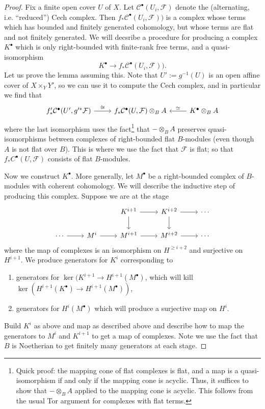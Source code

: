 \documentclass[10pt]{article}
\theoremstyle{definition}
\begin{document}
\begin{proof}
Fix a finite open cover $U$ of $X$.  Let $\mathcal{C}^\bullet(U_i, \mathcal{F})$ denote the (alternating, i.e. ``reduced'') Cech complex.  Then $f_* \mathcal{C}^\bullet(U_i, \mathcal{F}))$ is a complex whose terms which has bounded and finitely generated cohomology, but whose terms are flat and not finitely generated.  We will decsribe a procedure for producing a complex $K^\bullet$ which is only right-bounded with finite-rank free terms, and a quasi-isomorphism
$$K^\bullet \rightarrow f_* \mathcal{C}^\bullet(U_i, \mathcal{F})).$$
Let us prove the lemma assuming this.  Note that $U' := g^{-1}(U)$ is an open affine cover of $X \times_Y Y'$, so we can use it to compute the Cech complex, and in particular we find that
$$\begin{tikzcd}
f'_* \mathcal{C}^\bullet(U', g'^*\mathcal{F}) \arrow[r, "\cong"] & f_* \mathcal{C}^\bullet(U, \mathcal{F}) \otimes_B A & \arrow[l, "\simeq"'] K^\bullet \otimes_B A\end{tikzcd}$$
where the last isomorphism uses the fact\footnote{Quick proof: the mapping cone of flat complexes is flat, and a map is a quasi-isomorphism if and only if the mapping cone is acyclic.  Thus, it suffices to show that $- \otimes_B A$ applied to the mapping cone is acyclic.  This follows from the usual Tor argument for complexes with flat terms.} that $- \otimes_B A$ preserves quasi-isomorphisms between complexes of right-bounded flat $B$-modules (even though $A$ is not flat over $B$).  This is where we use the fact that $\mathcal{F}$ is flat; so that $f_* C^\bullet(U, \mathcal{F})$ consists of flat $B$-modules.




Now we construct $K^\bullet$.  More generally, let $M^\bullet$ be a right-bounded complex of $B$-modules with coherent cohomology.  We will describe the inductive step of producing this complex.  Suppose we are at the stage
$$\begin{tikzcd}
& & K^{i+1} \arrow[r] \arrow[d] & K^{i+2} \arrow[r] \arrow[d] & \cdots \\
\cdots \arrow[r] & M^i \arrow[r] & M^{i+1} \arrow[r] &M^{i+2} \arrow[r]&\cdots
\end{tikzcd}$$
where the map of complexes is an isomorphism on $H^{\geq i+2}$ and surjective on $H^{i+1}$.  We produce generators for $K^i$ corresponding to
\begin{enumerate}[(1)]
\item generators for $\ker(K^{i+1} \rightarrow H^{i+1}(M^\bullet)$, which will kill $\ker(H^{i+1}(K^\bullet) \rightarrow H^{i+1}(M^\bullet))$,
\item generators for $H^i(M^\bullet)$ which will produce a surjective map on $H^i$.
\end{enumerate}
Build $K^i$ as above and map as described above and describe how to map the generators to $M^i$ and $K^{i+1}$ to get a map of complexes.  Note we use the fact that $B$ is Noetherian to get finitely many generators at each stage.
\end{proof}
\end{document}
